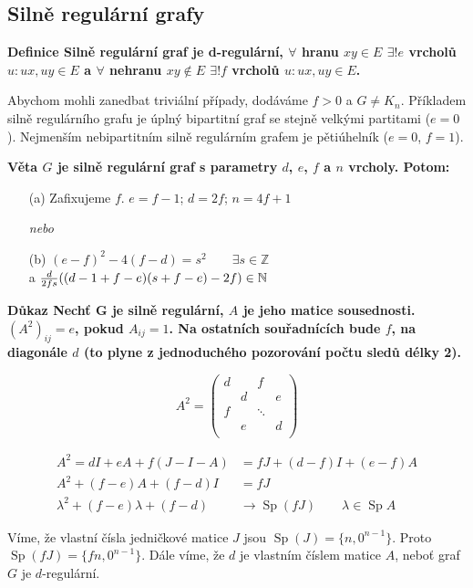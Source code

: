 \documentclass[a4paper,12pt,titlepage]{article}
\newcommand{\dk}{\smallskip\noindent\bf Důkaz\rm{} }
\newcommand{\df}{\smallskip\noindent\bf Definice\rm{} }
\newcommand{\vt}{\smallskip\noindent\bf Věta\rm{} }
\newcommand{\Z}{\mathbb{Z}}
\newcommand{\N}{\mathbb{N}}
\DeclareMathOperator{\Sp}{Sp}
\begin{document}
\subsection{Silně regulární grafy}

\df Silně regulární graf je d-regulární, $\forall$ hranu $xy\in E$ $\exists!e$
vrcholů $u: ux,uy\in E$ a $\forall$ nehranu $xy\not\in E$ $\exists!f$ vrcholů
$u: ux,uy\in E$.

Abychom mohli zanedbat triviální případy, dodáváme $f>0$ a $G\neq K_n$.
Příkladem silně regulárního grafu je úplný bipartitní graf se stejně velkými
partitami ($e=0$). Nejmenším nebipartitním silně regulárním grafem je
pětiúhelník ($e=0$, $f=1$).

\vt $G$ je silně regulární graf s parametry $d$, $e$, $f$ a $n$ vrcholy. Potom:
\begin{enumerate}
	\item[(a)] Zafixujeme $f$. $e = f-1$; $d = 2f$; $n = 4f+1$
	\item[] {\it nebo}
	\item[(b)] $(e-f)^2-4(f-d) = s^2 \qquad \exists s\in \Z$ \\
	a ${d\over 2fs}((d-1+f-e)(s+f-e)-2f) \in \N$
\end{enumerate}

\dk Nechť G je silně regulární, $A$ je jeho matice sousednosti. $(A^2)_{ij} =
e$, pokud $A_{ij} = 1$. Na ostatních souřadnících bude $f$, na diagonále $d$
(to plyne z jednoduchého pozorování počtu sledů délky 2).

$$
A^2 = \left(
	\begin{matrix}
		d & & f & \\
		& d & & e \\
		f & & \ddots & \\
		& e & & d\\
	\end{matrix}\right)
$$

\begin{align}
	A^2 = dI + eA + f(J-I-A) &= fJ + (d-f)I + (e-f)A \\
	A^2 + (f-e)A + (f-d)I &= fJ \\
	\lambda^2 + (f-e)\lambda + (f-d) &\rightarrow \Sp(fJ)\qquad \lambda\in\Sp A
\end{align}

Víme, že vlastní čísla jedničkové matice $J$ jsou $\Sp(J) = \{n, 0^{n-1}\}$.
Proto $\Sp(fJ) = \{fn, 0^{n-1}\}$. Dále víme, že $d$ je vlastním číslem matice
$A$, neboť graf $G$ je $d$-regulární.
\end{document}
